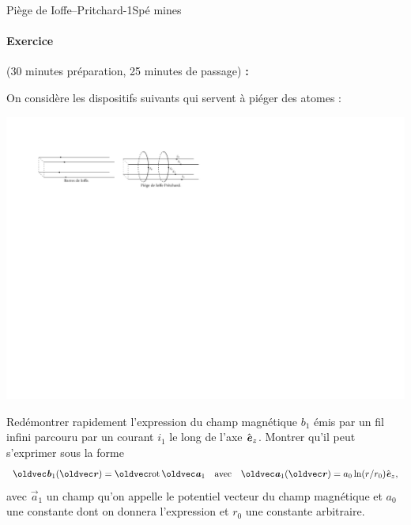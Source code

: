 \begin{exercise}{Piège de Ioffe--Pritchard}{-1}{Spé}
{}{mines}

\paragraph{Exercice} \textsf{(30 minutes préparation, 25 minutes de passage) \textbf{:}}

On considère les dispositifs suivants qui servent à piéger des atomes :
\begin{center}
    \includegraphics[width=\linewidth]{oraux/mines/Ioffe.pdf}  
\end{center}

\begin{questions}
    \questioncours Redémontrer rapidement l'expression du champ magnétique $b_1$ émis par un fil infini parcouru par un courant $i_1$ le long de l'axe $\hat{\bm{\mathit{e}}}_z$.
    \question Montrer qu'il peut s'exprimer sous la forme
    $$\vec{b}_1(\vr) = \rot\vec{a}_1 \qqtext{avec} \vec{a}_1(\vr) = a_0\ln (r/r_0)\ve_z,$$
    avec $\vec{a}_1$ un champ qu'on appelle le potentiel vecteur du champ magnétique et $a_0$ une constante dont on donnera l'expression et $r_0$ une constante arbitraire. \vspace{-1em}
    \uplevel{
}
\end{questions}
\end{exercise}
